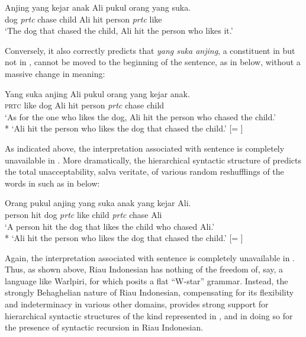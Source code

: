 \documentclass[output=paper]{langscibook}
\begin{document}
\ea \label{ex:gil:2}
\gll Anjing	yang	kejar	anak	Ali	pukul	orang	yang	suka.\\
 dog	\textit{prtc}	chase	child	Ali	hit	person	\textit{prtc}	like	\\
\glt `The dog that chased the child, Ali hit the person who likes it.'
\z

Conversely, it also correctly predicts that \textit{yang suka anjing}, a constituent in  but not in , cannot be moved to the beginning of the sentence, as in  below, without a massive change in meaning:

\ea \label{ex:gil:3}
\gll Yang	suka	anjing	Ali	pukul	orang	yang	kejar	anak.\\
 \textsc{prtc}	like	dog	Ali	hit	person	\textit{prtc}	chase	child\\
\glt `As for the one who likes the dog, Ali hit the person who chased the child.' \\
*	`Ali hit the person who likes the dog that chased the child.' [= ]
\z

As indicated above, the interpretation associated with sentence  is completely unavailable in .  More dramatically, the hierarchical syntactic structure of  predicts the total unacceptability, salva veritate, of various random reshufflings of the words in  such as in  below:

\ea \label{ex:gil:4}
\gll Orang	pukul	anjing	yang	suka	anak	yang	kejar	Ali. \\
    person	hit	dog	\textit{prtc}	like	child	\textit{prtc}	chase	Ali\\
\glt `A person hit the dog that likes the child who chased Ali.' \\
*	`Ali hit the person who likes the dog that chased the child.' [= ]
\z

Again, the interpretation associated with sentence  is completely unavailable in .  Thus, as shown above, Riau Indonesian has nothing of the freedom of, say, a language like Warlpiri, for which \citet{hale1979position, hale1983warlpiri} posits a flat ``W-star'' grammar. Instead, the strongly Behaghelian nature of Riau Indonesian, compensating for its flexibility and indeterminacy in various other domains, provides strong support for hierarchical syntactic structures of the kind represented in , and in doing so for the presence of syntactic recursion in Riau Indonesian.
\end{document}
